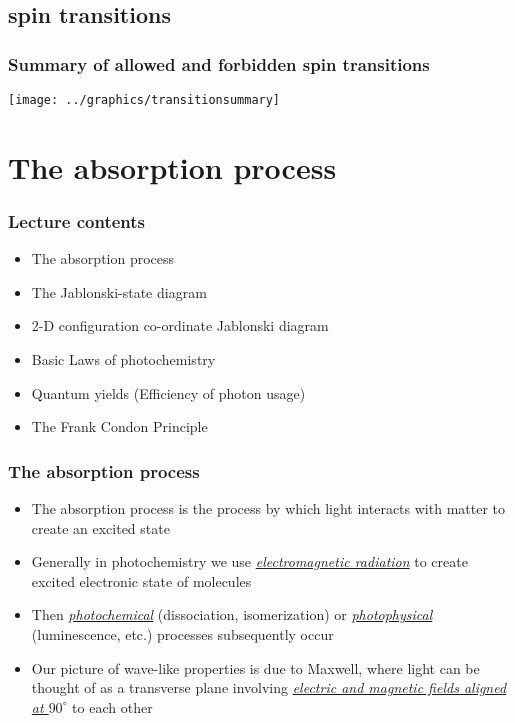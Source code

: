 \documentclass[ignorenonframetext]{beamer}
\begin{document}
\subsection{spin transitions}

\begin{frame}
\frametitle{Summary of allowed and forbidden spin transitions}
\begin{center}
\texttt{[image: ../graphics/transitionsummary]}
\end{center}
\end{frame}
	

\section{The absorption process}
	\begin{frame}
	\frametitle{Lecture contents}
		\begin{itemize}
			\item The absorption process
			\item The Jablonski-state diagram
			\item 2-D configuration co-ordinate Jablonski diagram
			\item Basic Laws of photochemistry
			\item Quantum yields (Efficiency of photon usage)
			\item The Frank Condon Principle
		\end{itemize}
	\end{frame}
	
\begin{frame}[<+->]
\frametitle{The absorption process}
\begin{itemize}
\item The absorption process is the process by which light interacts with matter to create an excited state
\item Generally in photochemistry we use \textit{\underline{electromagnetic radiation}} to create excited electronic state of molecules
\item Then \textit{\underline{photochemical}} (dissociation, isomerization) or \textit{\underline{photophysical}} (luminescence, etc.) processes subsequently occur
\item Our picture of wave-like properties is due to Maxwell, where light can be thought of as a transverse plane involving \textit{\underline{electric and magnetic fields aligned at \(90^\circ\)}} to each other
\end{itemize}
\end{frame}
\end{document}
